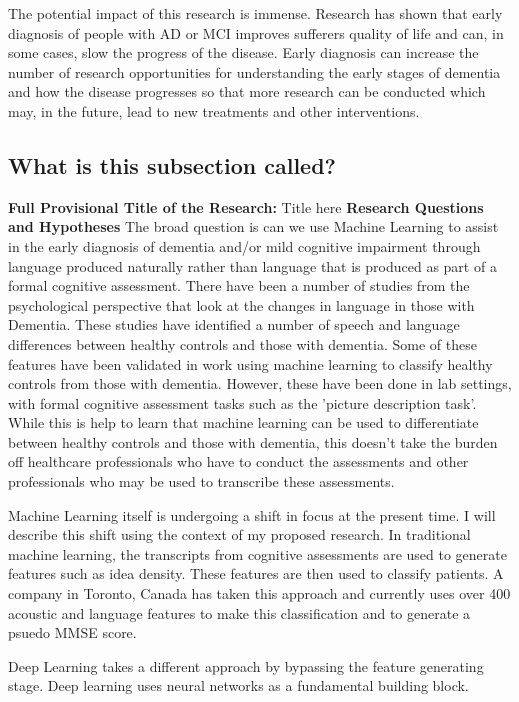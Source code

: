 \documentclass{article}
\begin{document}
\par
The potential impact of this research is immense. Research has shown that early diagnosis of people with AD or MCI improves sufferers quality of life and can, in some cases, slow the progress of the disease. Early diagnosis can increase the number of research opportunities for understanding the early stages of dementia and how the disease progresses so that more research can be conducted which may, in the future, lead to new treatments and other interventions. 
\subsection{What is this subsection called?}
\textbf{Full Provisional Title of the Research:} Title here \newline
\textbf{Research Questions and Hypotheses}
The broad question is can we use Machine Learning to assist in the early diagnosis of dementia and/or mild cognitive impairment through language produced naturally rather than language that is produced as part of a formal cognitive assessment. There have been a number of studies from the psychological perspective that look at the changes in language in those with Dementia. These studies have identified a number of speech and language differences between healthy controls and those with dementia. Some of these features have been validated in work using machine learning to classify healthy controls from those with dementia. However, these have been done in lab settings, with formal cognitive assessment tasks such as the 'picture description task'. While this is help to learn that machine learning can be used to differentiate between healthy controls and those with dementia, this doesn't take the burden off healthcare professionals who have to conduct the assessments and other professionals who may be used to transcribe these assessments. \newline
\par
Machine Learning itself is undergoing a shift in focus at the present time. I will describe this shift using the context of my proposed research. In traditional machine learning, the transcripts from cognitive assessments are used to generate features such as idea density. These features are then used to classify patients. A company in Toronto, Canada has taken this approach and currently uses over 400 acoustic and language features to make this classification and to generate a psuedo MMSE score. \newline
\par
Deep Learning takes a different approach by bypassing the feature generating stage. Deep learning uses neural networks as a fundamental building block.
\end{document}
